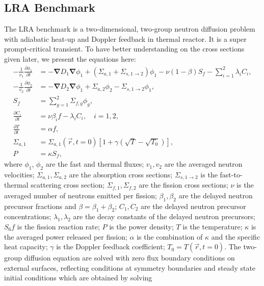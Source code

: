 \documentclass[12pt]{scrartcl}
\newcommand{\grad}{\bs{\nabla}}
\newcommand{\bs}[1]{\mathbf{#1}}
\begin{document}
\newpage

\subsection{LRA Benchmark}

The LRA benchmark is a two-dimensional, two-group neutron diffusion problem with adiabatic heat-up and Doppler feedback in thermal reactor.  It is a super prompt-critical transient.  To have better understanding on the cross sections given later, we present the equations here:
\begin{align}
-\frac{1}{v_1} \frac{\partial \phi_1}{\partial t} &= -\grad D_1 \grad\phi_1 + (\Sigma_{a,1} + \Sigma_{s, 1\rightarrow 2})\phi_1 - \nu(1-\beta)S_f  - \sum_{i=1}^2 \lambda_i C_i, \\
-\frac{1}{v_2} \frac{\partial \phi_2}{\partial t} &= -\grad D_2 \grad\phi_1 + \Sigma_{a,2}\phi_2 - \Sigma_{s, 1\rightarrow 2}\phi_1, \\
S_f &= \sum_{g=1}^2 \Sigma_{f,g} \phi_g, \\
\frac{\partial C_i}{\partial t} &= \nu\beta_i f - \lambda_i C_i, \quad i=1,2, \\
\frac{\partial T}{\partial t} &= \alpha f, \label{eq:lra-temp} \\
\Sigma_{a,1} &= \Sigma_{a,1}(\vec{r}, t=0) \left[1+\gamma\left(\sqrt{T} - \sqrt{T_0}\right)\right], \\
P &= \kappa S_f,
\end{align}
where $\phi_1$, $\phi_2$ are the fast and thermal fluxes; $v_1, v_2$ are the averaged neutron velocities; $\Sigma_{a,1}, \Sigma_{a,2}$ are the absorption cross sections; $\Sigma_{s,1\rightarrow 2}$ is the fast-to-thermal scattering cross section; $\Sigma_{f,1}, \Sigma_{f,2}$ are the fission cross sections; $\nu$ is the averaged number of neutrons emitted per fission; $\beta_1, \beta_2$ are the delayed neutron precursor fractions and $\beta=\beta_1 + \beta_2$; $C_1, C_2$ are the delayed neutron precursor concentrations; $\lambda_1, \lambda_2$ are the decay constants of the delayed neutron precursors; $S_6f$ is the fission reaction rate; $P$ is the power density; $T$ is the temperature; $\kappa$ is the averaged power released per fission; $\alpha$ is the combination of $\kappa$ and the specific heat capacity; $\gamma$ is the Doppler feedback coefficient; $T_0=T(\vec{r}, t=0)$.
The two-group diffusion equation are solved with zero flux boundary conditions on external surfaces, reflecting conditions at symmetry boundaries and steady state initial conditions which are obtained by solving
\end{document}
